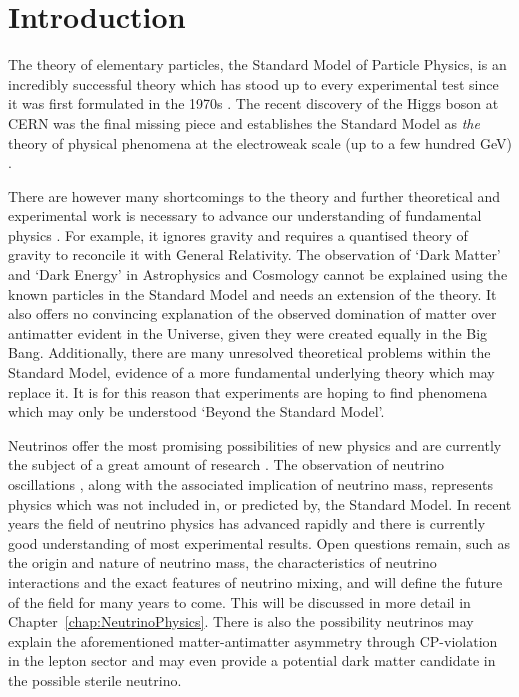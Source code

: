 
\graphicspath{{Introduction/Figs/}}

\chapter{Introduction}\label{chap:Introduction}

The theory of elementary particles, the Standard Model of Particle Physics, is an incredibly successful theory which has stood up to every experimental test since it was first formulated in the 1970s \cite{Glashow1961,Weinberg1967}.  The recent discovery of the Higgs boson at CERN \cite{Aad2012,Chatrchyan2012} was the final missing piece and establishes the Standard Model as \textit{the} theory of physical phenomena at the electroweak scale (up to a few hundred GeV) \cite{Shears2012,Bilenky2015}.

There are however many shortcomings to the theory and further theoretical and experimental work is necessary to advance our understanding of fundamental physics \cite{Ellis2012}.  For example, it ignores gravity and requires a quantised theory of gravity to reconcile it with General Relativity.  The observation of `Dark Matter' and `Dark Energy' in Astrophysics and Cosmology cannot be explained using the known particles in the Standard Model and needs an extension of the theory.  It also offers no convincing explanation of the observed domination of matter over antimatter evident in the Universe, given they were created equally in the Big Bang.  Additionally, there are many unresolved theoretical problems within the Standard Model, evidence of a more fundamental underlying theory which may replace it.  It is for this reason that experiments are hoping to find phenomena which may only be understood `Beyond the Standard Model'.

Neutrinos offer the most promising possibilities of new physics and are currently the subject of a great amount of research \cite{Bilenky2015}.  The observation of neutrino oscillations \cite{SuperKamiokande1998,SNO2002}, along with the associated implication of neutrino mass, represents physics which was not included in, or predicted by, the Standard Model.  In recent years the field of neutrino physics has advanced rapidly and there is currently good understanding of most experimental results.  Open questions remain, such as the origin and nature of neutrino mass, the characteristics of neutrino interactions and the exact features of neutrino mixing, and will define the future of the field for many years to come.  This will be discussed in more detail in Chapter~\ref{chap:NeutrinoPhysics}.  There is also the possibility neutrinos may explain the aforementioned matter-antimatter asymmetry through CP-violation in the lepton sector and may even provide a potential dark matter candidate in the possible sterile neutrino.

